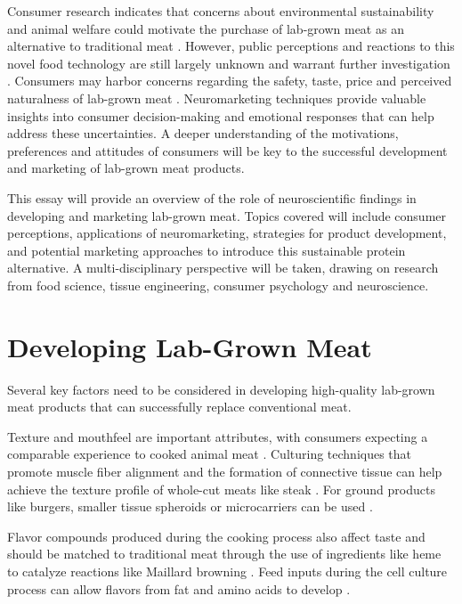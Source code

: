 \documentclass[10pt]{article}
\begin{document}
\begin{sloppypar}
  Consumer research indicates that concerns about environmental sustainability and animal welfare could motivate the purchase of lab-grown meat as an alternative to traditional meat \citep{circus_exploring_2018}. However, public perceptions and reactions to this novel food technology are still largely unknown and warrant further investigation \citep{verbeke_would_2015}. Consumers may harbor concerns regarding the safety, taste, price and perceived naturalness of lab-grown meat \citep{bryant_consumer_2018}. Neuromarketing techniques provide valuable insights into consumer decision-making and emotional responses that can help address these uncertainties. A deeper understanding of the motivations, preferences and attitudes of consumers will be key to the successful development and marketing of lab-grown meat products.

  This essay will provide an overview of the role of neuroscientific findings in developing and marketing lab-grown meat. Topics covered will include consumer perceptions, applications of neuromarketing, strategies for product development, and potential marketing approaches to introduce this sustainable protein alternative. A multi-disciplinary perspective will be taken, drawing on research from food science, tissue engineering, consumer psychology and neuroscience.

  \section{Developing Lab-Grown Meat  }
  \label{sec:developing-lab-grown-meat}

  Several key factors need to be considered in developing high-quality lab-grown meat products that can successfully replace conventional meat.

  Texture and mouthfeel are important attributes, with consumers expecting a comparable experience to cooked animal meat \citep{datar_possibilities_2010}. Culturing techniques that promote muscle fiber alignment and the formation of connective tissue can help achieve the texture profile of whole-cut meats like steak \citep{post_cultured_2012}. For ground products like burgers, smaller tissue spheroids or microcarriers can be used \citep{specht_opportunities_2018}.

  Flavor compounds produced during the cooking process also affect taste and should be matched to traditional meat through the use of ingredients like heme to catalyze reactions like Maillard browning \citep{post_cultured_2012}. Feed inputs during the cell culture process can allow flavors from fat and amino acids to develop \citep{kumar_-vitro_2021}.


\end{sloppypar}
\end{document}
